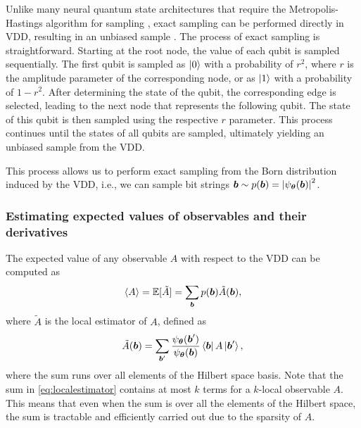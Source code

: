 \documentclass{ieeeaccess}
\begin{document}
Unlike many neural quantum state architectures that require the Metropolis-Hastings algorithm for sampling \cite{netket3}, exact sampling can be performed directly in VDD, resulting in an unbiased sample \cite{vivas2022nqs}.
The process of exact sampling is straightforward.
Starting at the root node, the value of each qubit is sampled sequentially.
The first qubit is sampled as $\ket{0}$ with a probability of $r^2$, where $r$ is the amplitude parameter of the corresponding node, or as $\ket{1}$ with a probability of $1 - r^2$.
After determining the state of the qubit, the corresponding edge is selected, leading to the next node that represents the following qubit.
The state of this qubit is then sampled using the respective $r$ parameter.
This process continues until the states of all qubits are sampled, ultimately yielding an unbiased sample from the VDD.

This process allows us to perform exact sampling from the Born distribution induced by the VDD, i.e., we can sample bit strings $\vb*{b}\sim p(\vb*{b})=\abs{\psi_{\vb*{\theta}}(\vb*{b})}^2$.


\subsubsection{Estimating expected values of observables and their derivatives}

The expected value of any observable $A$ with respect to the VDD can be computed as~\cite{netket3}
\begin{align}
    \expval{A} = \mathbb{E}[\tilde{A}] = \sum_{\vb*{b}}p(\vb*{b})\tilde{A}(\vb*{b}),
\end{align}
where $\tilde{A}$ is the local estimator of $A$, defined as
\begin{align}
    \tilde{A}(\vb*{b}) = \sum_{\vb*{b}'}\frac{\psi_{\vb*{\theta}}(\vb*{b}')}{\psi_{\vb*{\theta}}(\vb*{b})}\bra{\vb*{b}}A\ket*{\vb*{b}'},\label{eq:localestimator}
\end{align}
where the sum runs over all elements of the Hilbert space basis.
Note that the sum in \eqref{eq:localestimator} contains at most $k$ terms for a $k$-local observable $A$.
This means that even when the sum is over all the elements of the Hilbert space, the sum is tractable and efficiently carried out due to the sparsity of $A$.
\end{document}
